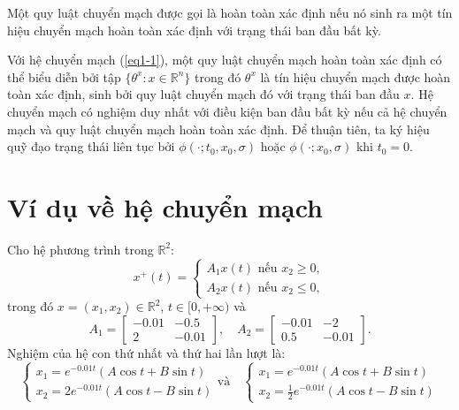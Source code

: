 \documentclass[14pt,a4paper,oneside]{report}		%
\theoremstyle{definition}
\begin{document}
Một quy luật chuyển mạch được gọi là hoàn toàn xác định nếu nó sinh ra một tín hiệu chuyển mạch hoàn toàn xác định với trạng thái ban đầu bất kỳ.

Với hệ chuyển mạch (\ref{eq1-1}), một quy luật chuyển mạch hoàn toàn xác định có thể biểu diễn bởi tập $\{\theta^x:x\in\mathbb{R}^n\}$ trong đó $\theta^x$ là tín hiệu chuyển mạch được hoàn toàn xác định, sinh bởi quy luật chuyển mạch đó với trạng thái ban đầu $x$. Hệ chuyển mạch có nghiệm duy nhất với điều kiện ban đầu bất kỳ nếu cả hệ chuyển mạch và quy luật chuyển mạch hoàn toàn xác định. Để thuận tiên, ta ký hiệu quỹ đạo trạng thái liên tục bởi $\phi(\cdot;t_0,x_0,\sigma)$ hoặc $\phi(\cdot;x_0,\sigma)$ khi $t_0=0$.

\section{Ví dụ về hệ chuyển mạch}
Cho hệ phương trình trong $\mathbb{R}^2$:
$$x^+(t) = 
\begin{cases} 
A_1x(t) \mbox{ nếu } x_2\geq 0, \\ 
A_2x(t) \mbox{ nếu } x_2\leq 0,
\end{cases}
$$
trong đó $x=(x_1,x_2)\in\mathbb{R}^2$, $t\in[0,+\infty)$ và
$$
A_1 = \begin{bmatrix} -0.01 & -0.5 \\ 2 & -0.01 \end{bmatrix} ,\quad 
A_2 = \begin{bmatrix} -0.01 & -2 \\ 0.5 & -0.01 \end{bmatrix} .
$$
Nghiệm của hệ con thứ nhất và thứ hai lần lượt là:
\begin{equation} \label{vd1}
\begin{cases}
x_1 = e^{-0.01t}(A\cos t+B\sin t)\\
x_2 = 2e^{-0.01t}(A\cos t-B\sin t)
\end{cases}
\text{và}\quad
\begin{cases}
x_1 = e^{-0.01t}(A\cos t+B\sin t)\\
x_2 = \frac{1}{2} e^{-0.01t}(A\cos t-B\sin t)
\end{cases}
\end{equation}
\end{document}
